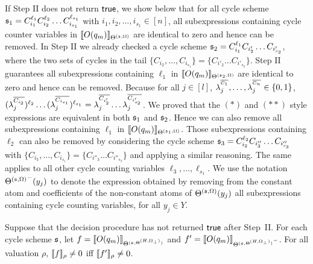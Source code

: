 If Step II does not return $\mathsf{true}$, we show below that for all cycle scheme ${\mathfrak{s} }_1=C_{i_1}^{\ell_1} C_{i_2}^{\ell_2} \dots C_{i_{s_1}}^{\ell_{s_1}}$ with $i_1,i_2,\dots,i_{s_1} \in [n]$, all subexpressions containing cycle counter variables in $\llbracket O(q_m)\rrbracket_{\Theta^{({\mathfrak{s} },\Omega)}}$ are identical to zero and hence can be removed.
In Step II we already checked a cycle scheme ${\mathfrak{s} }_2=C_{i_1}^{\ell_1} C_{i'_2} \dots C_{i'_{s_2}}$, where the two sets of cycles in the tail 
$\{C_{i_2} ,\dots, C_{i_{s_1}}\}=\{C_{i'_2} \dots C_{i'_{s_2}}\}$. Step II guarantees all subexpressions containing $\ell_1$ in 
$\llbracket O(q_m)\rrbracket_{\Theta^{({\mathfrak{s} }_2,\Omega)}}$ are identical to zero and hence can be removed.
Because for all $j\in[l]$, $\lambda^{^{\overline{C_1}}}_j, \dots, \lambda^{^{\overline{C_n}}}_j \in \{0,1\}$,   $(\lambda^{\overline{C_{i_2}}}_{j})^{\ell_2} \dots (\lambda^{\overline{C_{i_{s_1}}}}_{j})^{\ell_{s_1}} = \lambda^{\overline{C_{i'_2}}}_{j} \dots \lambda^{\overline{C_{i'_{s_2}}}}_{j}$. We proved that the $(\ast)$ and $(\ast\ast)$ style expressions are equivalent in both ${\mathfrak{s} }_1$ and ${\mathfrak{s} }_2$.
Hence we can also remove all subexpressions containing $\ell_1$ in  $\llbracket O(q_m)\rrbracket_{\Theta^{({\mathfrak{s} }_1,\Omega)}}$.
Those subexpressions containing $\ell_2$ can also be removed by considering the cycle scheme ${\mathfrak{s} }_3=C_{i_2}^{\ell_2} C_{i''_3} \dots C_{i''_{s_3}}$ with $\{C_{i_3} ,\dots, C_{i_{s_1}}\}=\{C_{i''_3} \dots C_{i''_{s_3}}\}$ and applying a similar reasoning. The same applies to all other cycle counting variables $\ell_3,\dots,\ell_{s_1}$.
We use the notation ${\Theta^{({\mathfrak{s} },\Omega)}}^-(y_j)$ to denote the expression obtained by removing from the constant atom and coefficients of the non-constant atoms of $\Theta^{({\mathfrak{s} },\Omega)}(y_j)$ all subexpressions containing cycle counting variables, for all $y_j \in Y$. 

\begin{lemma}\label{prop-bnd-domain-1}
	Suppose that the decision procedure has not returned $\mathsf{true}$ after Step~II. For each cycle scheme ${\mathfrak{s} }$, let $f=\llbracket O(q_m)\rrbracket_{\Theta^{({\mathfrak{s} }, \Theta^{(H,\Omega_\bot)})}}$ and $f'=\llbracket O(q_m)\rrbracket_{{\Theta^{({\mathfrak{s} }, \Theta^{(H,\Omega_\bot)})}}^-}$. For all valuation $\rho$, $\llbracket f\rrbracket_{\rho}\neq 0$ iff $\llbracket f'\rrbracket_{\rho} \neq 0$.
\end{lemma}





